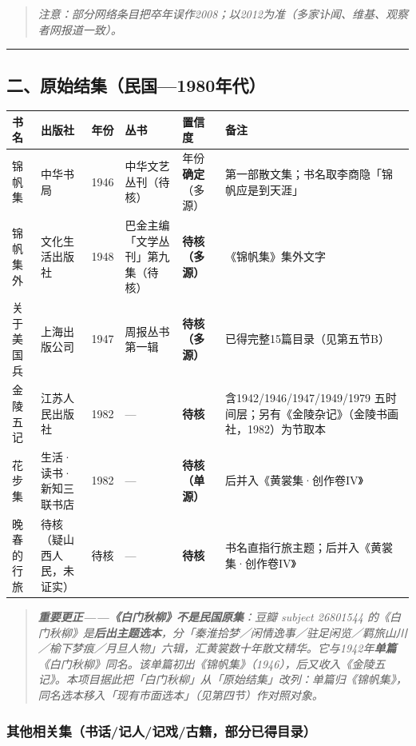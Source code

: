 \documentclass[UTF8,fontset=none,zihao=-4,a4paper]{ctexart}
\begin{document}
\begin{quote}\small\itshape
注意：部分网络条目把卒年误作2008；以2012为准（多家讣闻、维基、观察者网报道一致）。
\end{quote}

\medskip\hrule\medskip

\subsection{二、原始结集（民国—1980年代）}


\begin{center}
\tiny
\begin{tabularx}{\linewidth}{@{}XXXXXX@{}}
\toprule
\textbf{书名} & \textbf{出版社} & \textbf{年份} & \textbf{丛书} & \textbf{置信度} & \textbf{备注} \\
\midrule
锦帆集 & 中华书局 & 1946 & 中华文艺丛刊（待核） & 年份\textbf{确定}（多源） & 第一部散文集；书名取李商隐「锦帆应是到天涯」 \\
锦帆集外 & 文化生活出版社 & 1948 & 巴金主编「文学丛刊」第九集（待核） & \textbf{待核（多源）} & 《锦帆集》集外文字 \\
关于美国兵 & 上海出版公司 & 1947 & 周报丛书第一辑 & \textbf{待核（多源）} & 已得完整15篇目录（见第五节B） \\
金陵五记 & 江苏人民出版社 & 1982 & — & \textbf{待核} & 含1942/1946/1947/1949/1979 五时间层；另有《金陵杂记》（金陵书画社，1982）为节取本 \\
花步集 & 生活·读书·新知三联书店 & 1982 & — & \textbf{待核（单源）} & 后并入《黄裳集·创作卷IV》 \\
晚春的行旅 & 待核（疑山西人民，未证实） & 待核 & — & \textbf{待核} & 书名直指行旅主题；后并入《黄裳集·创作卷IV》 \\
\bottomrule
\end{tabularx}
\end{center}


\begin{quote}\small\itshape
\textbf{ 重要更正——《白门秋柳》不是民国原集}：豆瓣 subject 26801544 的《白门秋柳》是\textbf{后出主题选本}，分「秦淮拾梦／闲情逸事／驻足闲览／羁旅山川／榆下梦痕／月旦人物」六辑，汇黄裳数十年散文精华。它与1942年\textbf{单篇}《白门秋柳》同名。该单篇初出《锦帆集》（1946），后又收入《金陵五记》。本项目据此把「白门秋柳」从「原始结集」改列：单篇归《锦帆集》，同名选本移入「现有市面选本」（见第四节）作对照对象。
\end{quote}

\subsubsection{其他相关集（书话/记人/记戏/古籍，部分已得目录）}
\end{document}
